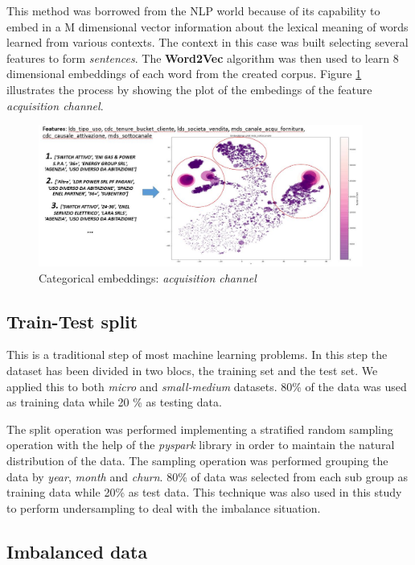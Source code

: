 \documentclass[LaM,binding=0.6cm, english]{sapthesis}
\begin{document}
This method was borrowed from the NLP world because of its capability to embed in a M dimensional vector information about the lexical meaning of words learned from various contexts. The context in this case was built selecting several features to form \textit{sentences}. The \textbf{Word2Vec} algorithm was then used to learn 8 dimensional embeddings of each word from the created corpus. Figure \ref{fig:categorical-embeddings} illustrates the process by showing the plot of the embedings of the feature \textit{acquisition channel}.

\begin{figure}[!ht]
    \includegraphics[width=0.95\textwidth]{images/categorical_embeddings.jpg}
    \centering
    \caption{Categorical embeddings: \textit{acquisition channel}}
    \label{fig:categorical-embeddings}
\end{figure}

\subsection{Train-Test split}

This is a traditional step of most machine learning problems. In this step the dataset has been divided in two blocs, the training set and the test set. We applied this to both \textit{micro} and \textit{small-medium} datasets. 80\% of the data was used as training data while 20 \% as testing data.

The split operation was performed implementing a stratified random sampling operation with the help of the \textit{pyspark} library in order to maintain the natural distribution of the data. The sampling operation was performed grouping the data by \textit{year}, \textit{month} and \textit{churn}. 80\% of data was selected from each sub group as training data while 20\% as test data. This technique was also used in this study to perform undersampling to deal with the imbalance situation.

\subsection{Imbalanced data}
\end{document}
